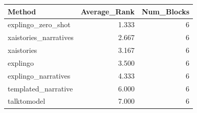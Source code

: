 \begin{tabular}{lrr}
\toprule
Method & Average_Rank & Num_Blocks \\
\midrule
explingo_zero_shot & 1.333 & 6 \\
xaistories_narratives & 2.667 & 6 \\
xaistories & 3.167 & 6 \\
explingo & 3.500 & 6 \\
explingo_narratives & 4.333 & 6 \\
templated_narrative & 6.000 & 6 \\
talktomodel & 7.000 & 6 \\
\bottomrule
\end{tabular}
